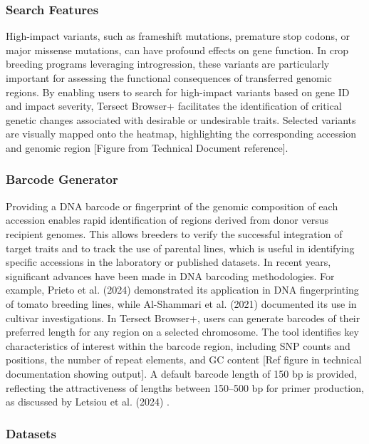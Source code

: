 \documentclass[unnumsec,webpdf,contemporary,large]{oup-authoring-template}%
\theoremstyle{thmstyleone}%
\theoremstyle{thmstyletwo}%
\theoremstyle{thmstylethree}%
\begin{document}
\subsubsection{Search Features}

High-impact variants, such as frameshift mutations, premature stop codons, or major missense mutations, can have profound effects on gene function. In crop breeding programs leveraging introgression, these variants are particularly important for assessing the functional consequences of transferred genomic regions. By enabling users to search for high-impact variants based on gene ID and impact severity, Tersect Browser+ facilitates the identification of critical genetic changes associated with desirable or undesirable traits. Selected variants are visually mapped onto the heatmap, highlighting the corresponding accession and genomic region [Figure from Technical Document reference].

\subsubsection{Barcode Generator}

Providing a DNA barcode or fingerprint of the genomic composition of each accession enables rapid identification of regions derived from donor versus recipient genomes. This allows breeders to verify the successful integration of target traits and to track the use of parental lines, which is useful in identifying specific accessions in the laboratory or published datasets. In recent years, significant advances have been made in DNA barcoding methodologies. For example, Prieto et al. (2024)\cite{espinosa_prieto_finding_2024} demonstrated its application in DNA fingerprinting of tomato breeding lines, while Al-Shammari et al. (2021) \cite{al2021genetic} documented its use in cultivar investigations. In Tersect Browser+, users can generate barcodes of their preferred length for any region on a selected chromosome. The tool identifies key characteristics of interest within the barcode region, including SNP counts and positions, the number of repeat elements, and GC content [Ref figure in technical documentation showing output]. A default barcode length of 150 bp is provided, reflecting the attractiveness of lengths between 150–500 bp for primer production, as discussed by Letsiou et al. (2024) \cite{letsiou_dna_2024}.

\subsubsection{Datasets}
\end{document}
